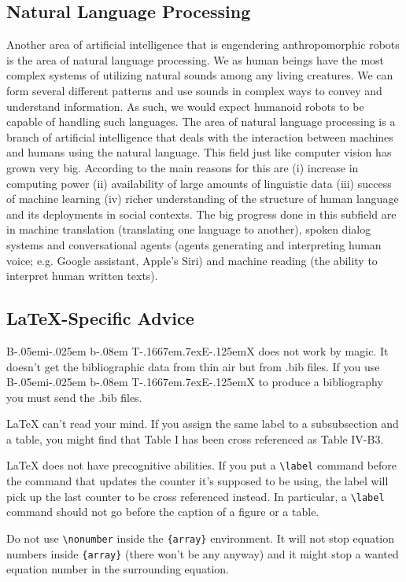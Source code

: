 \documentclass[conference]{IEEEtran}
\def\BibTeX{{\rm B\kern-.05em{\sc i\kern-.025em b}\kern-.08em
    T\kern-.1667em\lower.7ex\hbox{E}\kern-.125emX}}
\begin{document}
\subsection{Natural Language Processing}
Another area of artificial intelligence that is engendering anthropomorphic robots is the area of natural language processing. We as human beings have the most complex systems of utilizing natural sounds among any living creatures. We can form several different patterns and use sounds in complex ways to convey and understand information. As such, we would expect humanoid robots to be capable of handling such languages. The area of natural language processing is a branch of artificial intelligence that deals with the interaction between machines and humans using the natural language. This field just like computer vision has grown very big. According to \textcite{hirschberg2015advances} the main reasons for this are (i) increase in computing power (ii) availability of large amounts of linguistic data (iii) success of machine learning (iv) richer understanding of the structure of human language and its deployments in social contexts. The big progress done in this subfield are in machine translation (translating one language to another), spoken dialog systems and conversational agents (agents generating and interpreting human voice; e.g. Google assistant, Apple's Siri) and machine reading (the ability to interpret human written texts)\autocite{hirschberg2015advances}.

\subsection{\LaTeX-Specific Advice}

{\BibTeX} does not work by magic. It doesn't get the bibliographic
data from thin air but from .bib files. If you use {\BibTeX} to produce a
bibliography you must send the .bib files. 

{\LaTeX} can't read your mind. If you assign the same label to a
subsubsection and a table, you might find that Table I has been cross
referenced as Table IV-B3. 

{\LaTeX} does not have precognitive abilities. If you put a
\verb|\label| command before the command that updates the counter it's
supposed to be using, the label will pick up the last counter to be
cross referenced instead. In particular, a \verb|\label| command
should not go before the caption of a figure or a table.

Do not use \verb|\nonumber| inside the \verb|{array}| environment. It
will not stop equation numbers inside \verb|{array}| (there won't be
any anyway) and it might stop a wanted equation number in the
surrounding equation.
\end{document}
